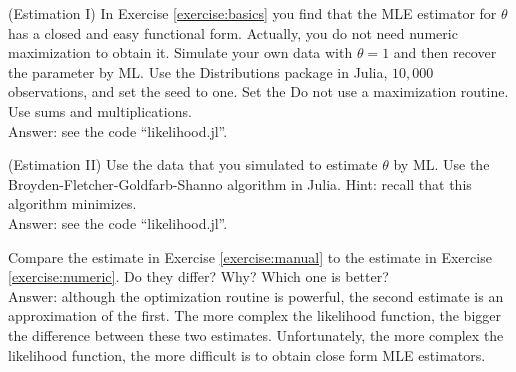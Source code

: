 \begin{exercise} (Estimation I) \label{exercise:manual}
In Exercise \ref{exercise:basics} you find that the MLE estimator for $\theta$ has a closed and easy functional form. Actually, you do not need numeric maximization to obtain it. Simulate your own data with $\theta = 1$ and then recover the parameter by ML. Use the Distributions package in Julia, $10,000$ observations, and set the seed to one. Set the Do not use a maximization routine. Use sums and multiplications.\\ 
\noindent Answer: see the code ``likelihood.jl''.
\end{exercise}

\begin{exercise} (Estimation II) \label{exercise:numeric}
Use the data that you simulated to estimate $\theta$ by ML. Use the Broyden-Fletcher-Goldfarb-Shanno algorithm in Julia. Hint: recall that this algorithm minimizes.\\
\noindent Answer: see the code ``likelihood.jl''.
\end{exercise}

\begin{exercise} 
Compare the estimate in Exercise \ref{exercise:manual} to the estimate in Exercise \ref{exercise:numeric}. Do they differ? Why? Which one is better?\\
\noindent Answer: although the optimization routine is powerful, the second estimate is an approximation of the first. The more complex the likelihood function, the bigger the difference between these two estimates. Unfortunately, the more complex the likelihood function,  the more difficult is to obtain close form MLE estimators. 
\end{exercise}


 


